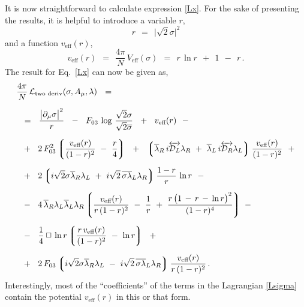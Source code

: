 \documentclass[epsfig,12pt]{article}
\def\beq{\begin{equation}}
\def\eeq{\end{equation}}
\newcommand{\cell}{{\mathcal L}}
\newcommand{\p}{\partial}
\newcommand{\ov}{\overline}
\newcommand{\md}{\mathcal{D}}
\newcommand{\lgr}{\left\lgroup}
\newcommand{\rgr}{\right\rgroup}
\begin{document}
	It is now straightforward to calculate expression \eqref{Lx}. 
	For the sake of presenting the results, it is helpful to introduce a variable $ r $,
\beq
	r    ~~=~~    \big|\sqrt{2}\sigma\big|^2
\eeq
	and a function $ v_\text{eff}(r) $,
\beq
	v_\text{eff}(r)    ~~=~~    \frac{4\pi}{N}\, V_\text{eff}(\sigma)    ~~=~~    r\, \ln r  ~~+~~  1  ~~-~~  r\,.
\eeq
	The result for Eq.~\eqref{Lx} can now be given as,
\begin{align}
%
\notag
	& \frac{4\pi}{N}\, \cell_\text{two deriv}(\sigma, A_\mu, \lambda)    ~~=~~  
	\\[2mm]
%
\notag
	& ~~=~~
	\frac{ \big|\p_\mu \sigma\big|^2 } r
	~~-~~
	F_{03}\, \log\, \frac{\sqrt{2}\sigma}{\sqrt{2}\ov\sigma}
	~~+~~
	v_\text{eff}(r)
	~~-
	\\[2mm]
%
\notag
	&
	~~+~~
	2\, F_{03}^2
	\lgr \frac{v_\text{eff}(r)}{(1 - r)^2}  ~-~  \frac{r}{4} \rgr
	~~+~~
	\lgr 
		\ov\lambda{}_R\, i\overleftrightarrow{\md_L} \lambda_R  ~+~ 
		\ov\lambda{}_L\, i\overleftrightarrow{\md_R} \lambda_L
	\rgr
	\frac{v_\text{eff}(r)}{(1 - r)^2}
	~~+
	\\[2mm]
%
\label{Lsigma}
	&
	~~+~~ 
	2 \lgr
		i\sqrt{2}\sigma\ov\lambda{}_R\lambda_L  ~+~  
		i\sqrt{2}\,\ov{\sigma\lambda}{}_L\lambda_R
	\rgr
	\frac{1 - r}{r}\, \ln r
	~~-
	\\[2mm]
%
\notag
	&
	~~-~~
	4\, \ov\lambda{}_R \lambda_L \ov\lambda{}_L \lambda_R
	\lgr
		\frac{v_\text{eff}(r)}{r\, (1 - r)^2}
		~-~  \frac{1}{r}
		~+~  \frac{r\, \big( 1 \,-\, r \,-\, \ln r \big)^2}{ (1 - r)^4 }
	\rgr
	~-
	\\[2mm]
%
\notag
	&
	~~-~~
	\frac{1}{4}\,\Box\,\ln r
	\lgr
		\frac{r\, v_\text{eff}(r)}{(1 - r)^2}  ~-~  \ln r
	\rgr
	~~+
	\\[2mm]
%
\notag
	&
	~~+~~
	2\, F_{03} \lgr 
			i\sqrt{2}\sigma\ov\lambda{}_R\lambda_L ~-~
			i\sqrt{2}\,\ov{\sigma\lambda}{}_L\lambda_R
		   \rgr
	\frac{v_\text{eff}(r)}{r\, (1 - r)^2}\,.
\end{align}
	Interestingly, most of the ``coefficients'' of the terms in the Lagrangian \eqref{Lsigma} contain 
	the potential $ v_\text{eff}(r) $ in this or that form.


\end{document}

